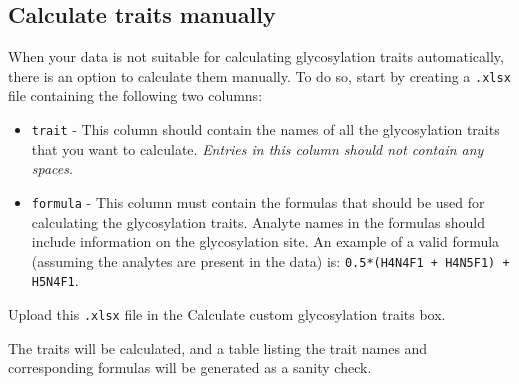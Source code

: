 \subsection{Calculate traits manually}
When your data is not suitable for calculating glycosylation traits automatically, there is an option to calculate them manually. 
To do so, start by creating a \texttt{.xlsx} file containing the following two columns:
\begin{itemize}[topsep=0pt, itemsep=0pt]
	\item \texttt{trait} - This column should contain the names of all the glycosylation traits that you want to calculate. \emph{Entries in this column should not contain any spaces}.
	\item \texttt{formula} - This column must contain the formulas that should be used for calculating the glycosylation traits. 
	Analyte names in the formulas should include information on the glycosylation site.
	An example of a valid formula (assuming the analytes are present in the data) is: \texttt{0.5*(H4N4F1 + H4N5F1) + H5N4F1}.
\end{itemize}

Upload this \texttt{.xlsx} file in the \textsf{Calculate custom glycosylation traits} box.

The traits will be calculated, and a table listing the trait names and corresponding formulas will be generated as a sanity check.
